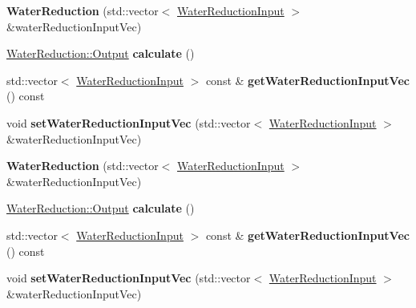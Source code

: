 \begin{DoxyCompactItemize}
\item 
\mbox{\label{class_water_reduction_a51ac64467b3fd5dbb4a1f916a3d61b84}} 
{\bfseries Water\+Reduction} (std\+::vector$<$ \hyperlink{class_water_reduction_input}{Water\+Reduction\+Input} $>$ \&water\+Reduction\+Input\+Vec)
\item 
\mbox{\label{class_water_reduction_a24453d098797a0b1a1f69836abff4281}} 
\hyperlink{struct_water_reduction_1_1_output}{Water\+Reduction\+::\+Output} {\bfseries calculate} ()
\item 
\mbox{\label{class_water_reduction_ac2c0497b047722a30db004d460f7520d}} 
std\+::vector$<$ \hyperlink{class_water_reduction_input}{Water\+Reduction\+Input} $>$ const  \& {\bfseries get\+Water\+Reduction\+Input\+Vec} () const
\item 
\mbox{\label{class_water_reduction_a29b38ac42b6c9145e0765818bb8f5924}} 
void {\bfseries set\+Water\+Reduction\+Input\+Vec} (std\+::vector$<$ \hyperlink{class_water_reduction_input}{Water\+Reduction\+Input} $>$ \&water\+Reduction\+Input\+Vec)
\item 
\mbox{\label{class_water_reduction_a51ac64467b3fd5dbb4a1f916a3d61b84}} 
{\bfseries Water\+Reduction} (std\+::vector$<$ \hyperlink{class_water_reduction_input}{Water\+Reduction\+Input} $>$ \&water\+Reduction\+Input\+Vec)
\item 
\mbox{\label{class_water_reduction_a24453d098797a0b1a1f69836abff4281}} 
\hyperlink{struct_water_reduction_1_1_output}{Water\+Reduction\+::\+Output} {\bfseries calculate} ()
\item 
\mbox{\label{class_water_reduction_ac2c0497b047722a30db004d460f7520d}} 
std\+::vector$<$ \hyperlink{class_water_reduction_input}{Water\+Reduction\+Input} $>$ const  \& {\bfseries get\+Water\+Reduction\+Input\+Vec} () const
\item 
\mbox{\label{class_water_reduction_a29b38ac42b6c9145e0765818bb8f5924}} 
void {\bfseries set\+Water\+Reduction\+Input\+Vec} (std\+::vector$<$ \hyperlink{class_water_reduction_input}{Water\+Reduction\+Input} $>$ \&water\+Reduction\+Input\+Vec)

\end{DoxyCompactItemize}
